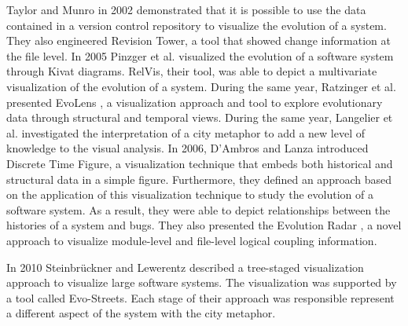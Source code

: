 Taylor and Munro \cite{Taylor2002} in 2002 demonstrated that it is possible to use the data contained in a version control repository to visualize the evolution of a system.
They also engineered Revision Tower, a tool that showed change information at the file level. 
In 2005 Pinzger et al. \cite{Pinzger2005} visualized the evolution of a software system through Kivat diagrams.
RelVis, their tool, was able to depict a multivariate visualization of the evolution of a system.
During the same year, Ratzinger et al. presented EvoLens \cite{Ratzinger2005}, a visualization approach and tool to 
explore evolutionary data through structural and temporal views.  
During the same year, Langelier et al. \cite{Langelier2005} investigated the interpretation of a city metaphor 
\cite{Knight2000} to add a new level of knowledge to the visual analysis.
In 2006, D’Ambros and Lanza \cite{DAmbros2006} introduced Discrete Time Figure,
 a visualization technique that embeds both historical and structural data in a simple figure. 
 Furthermore, they defined an approach based on the application of this visualization technique to study the evolution of a software system. 
As a result, they were able to depict relationships between the histories of a system and bugs. 
They also presented the Evolution Radar \cite{DAmbros2006a}, a novel approach to visualize module-level and file-level logical coupling information.

  

In 2010 Steinbrückner and Lewerentz \cite{Steinbrueckner2010} described a tree-staged visualization approach to visualize large software systems. 
The visualization was supported by a tool called Evo-Streets. 
Each stage of their approach was responsible represent a different aspect of the system with the city metaphor. 



